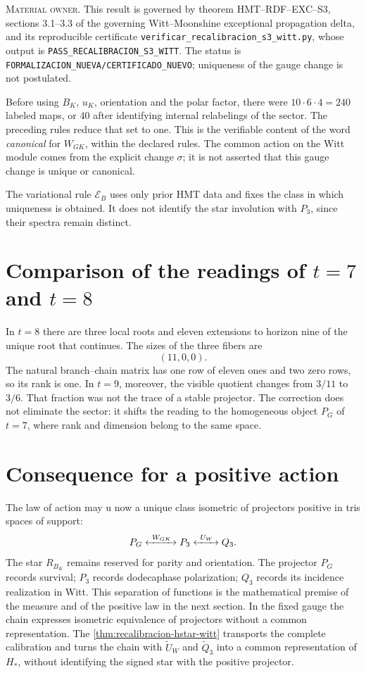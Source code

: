 \textsc{Material owner.} This result is governed by theorem
\textsc{HMT--RDF--EXC--S3}, sections 3.1--3.3 of the governing Witt--Moonshine exceptional
propagation delta, and its reproducible certificate
\texttt{verificar\_recalibracion\_s3\_witt.py}, whose output is
\texttt{PASS\_RECALIBRACION\_S3\_WITT}. The status is
\texttt{FORMALIZACION\_NUEVA/CERTIFICADO\_NUEVO}; uniqueness of the
gauge change is not postulated.

Before using \(B_K\), \(u_K\), orientation and the polar factor, there were
\(10\cdot6\cdot4=240\) labeled maps, or \(40\) after identifying
internal relabelings of the sector. The preceding rules reduce that
set to one. This is the verifiable content of the word
\emph{canonical} for \(W_{GK}\), within the declared rules. The common
action on the Witt module comes from the explicit change \(\sigma\); it is not
asserted that this gauge change is unique or canonical.

The variational rule \(\mathcal E_B\) uses only prior HMT data
and fixes the class in which uniqueness is obtained. It does not identify the star
involution with \(P_3\), since their spectra remain distinct.

\section{Comparison of the readings of \texorpdfstring{\(t=7\) and \(t=8\)}{t=7 and t=8}}

In \(t=8\) there are three local roots and eleven extensions to horizon nine of
the unique root that continues. The sizes of the three fibers are
\[
 (11,0,0).
\]
The natural branch--chain matrix has one row of eleven ones and two
zero rows, so its rank is one. In \(t=9\), moreover, the visible quotient
changes from \(3/11\) to \(3/6\). That fraction was not the trace of a
stable projector. The correction does not eliminate the sector: it shifts the reading
to the homogeneous object \(P_G\) of \(t=7\), where rank and dimension
belong to the same space.

\section{Consequence for a positive action}

The law of action may u now a unique class isometric of projectors
positive in tris spaces of support:
\[
 P_G
 \xleftrightarrow{\ W_{GK}\ }
 P_3
 \xleftrightarrow{\ U_W\ }
 Q_3.
\]
The star \(R_{B_K}\) remains reserved for parity and orientation. The
projector \(P_G\) records survival; \(P_3\) records dodecaphase
polarization; \(Q_3\) records its incidence realization in Witt. This
separation of functions is the mathematical premise of the measure and of the positive
law in the next section. In the fixed gauge the chain expresses
isometric equivalence of projectors without a common representation. The
\cref{thm:recalibracion-hstar-witt} transports the complete calibration and
turns the chain with \(\widetilde U_W\) and \(\widetilde Q_3\) into a
common representation of \(H_*\), without identifying the signed star with the
positive projector.

